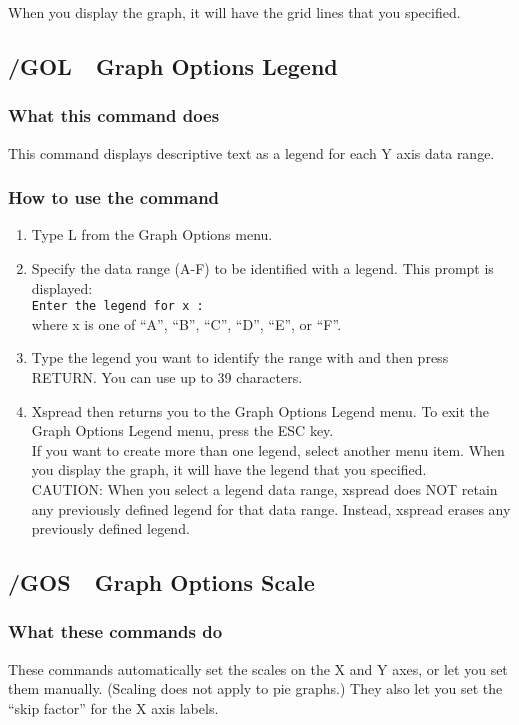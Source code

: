 When you display the graph, it will have the grid lines that you specified.

\subsection*{/GOL\ \     Graph Options Legend}

\subsubsection*{What this command does}
This command displays descriptive text as a legend for each Y axis 
data range.

\subsubsection*{How to use the command}
\begin{enumerate}
\item{Type L from the Graph Options menu.}
\item{Specify the data range (A-F) to be identified with a legend.  This
prompt is displayed:\\
{\tt Enter the legend for x :}\\
where x is one of ``A'', ``B'', ``C'', ``D'', ``E'', or ``F''.}
\item{Type the legend you want to identify the range with and then press
RETURN.  You can use up to 39 characters.}
\item{Xspread then returns you to the Graph Options Legend menu.  To
exit the Graph Options Legend menu, press the ESC key.\\
        If you want to create more than one legend, select another menu item.
When you display the graph, it will have the legend that you 
specified.\\
CAUTION:  When you select a legend data range, xspread does NOT retain 
any previously defined legend for that data range.  Instead, xspread 
erases any previously defined legend.}
\end{enumerate}

\subsection*{/GOS\ \     Graph Options Scale}

\subsubsection*{What these commands do}
These commands automatically set the scales on the X and Y axes, or 
let you set them manually.  (Scaling does not apply to pie graphs.)  
They also let you set the ``skip factor'' for the X axis labels.

